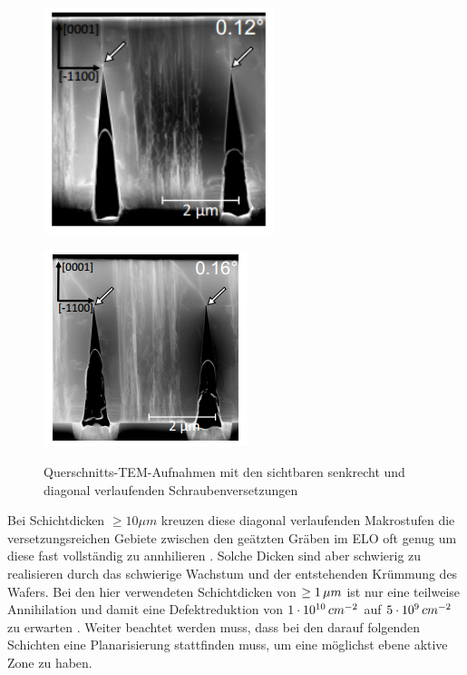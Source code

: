 \begin{figure}[ht!]
  \centering
  \begin{minipage}[t]{0.49\textwidth}
    \centering
    \includegraphics[width=0.6\textwidth]{Bilder/offcutsenkrecht.png}
    \label{}
  \end{minipage}
	\hfill
  \begin{minipage}[t]{0.49\textwidth}
    \centering
    \includegraphics[width=0.6\linewidth]{Bilder/offcutdiagonal.png}
    \label{}
  \end{minipage}
	\caption{Querschnitts-TEM-Aufnahmen mit den sichtbaren senkrecht und diagonal verlaufenden Schraubenversetzungen}
	\label{schraubenvers}
\end{figure}
Bei Schichtdicken $ \geq 10 \mu m $ kreuzen diese diagonal verlaufenden Makrostufen die versetzungsreichen Gebiete zwischen den geätzten Gräben im ELO oft genug um diese fast vollständig zu annhilieren \cite{fmehnke}. Solche Dicken sind aber schwierig zu realisieren durch das schwierige Wachstum und der entstehenden Krümmung des Wafers. Bei den hier verwendeten Schichtdicken von $ \geq 1\thinspace \mu m $ ist nur eine teilweise Annihilation und damit eine Defektreduktion von $1\cdot 10^{10} \thinspace cm^{-2}$ auf $5\cdot 10^9 \thinspace cm^{-2}$ zu erwarten \cite{fmehnke}. 
\newline
Weiter beachtet werden muss, dass bei den darauf folgenden Schichten eine Planarisierung stattfinden muss, um eine möglichst ebene aktive Zone zu haben. 

